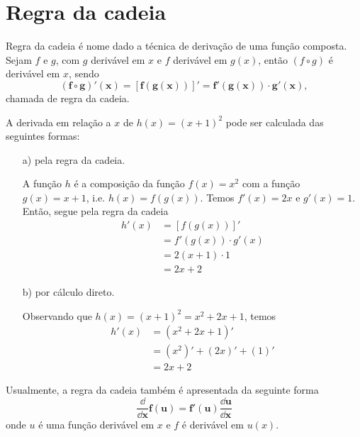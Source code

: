 \cleardoublepage\documentclass[../main.tex]{subfiles}
\begin{document}
\section{Regra da cadeia}\label{Chap:RegraCadeia}
Regra da cadeia é nome dado a técnica de derivação de uma função composta. Sejam $f$ e $g$, com $g$ derivável em $x$ e $f$ derivável em $g(x)$, então $(f\circ g)$ é derivável em $x$, sendo
\begin{equation}
  \boldsymbol{(f\circ g)'(x) = [f(g(x))]' = f'(g(x))\cdot g'(x)},
\end{equation}
chamada de regra da cadeia.

\begin{ex}
  A derivada em relação a $x$ de $h(x) = (x+1)^2$ pode ser calculada das seguintes formas:
  \begin{enumerate}
  \item[a)] pela regra da cadeia.
  
\begin{solution}
    A função $h$ é a composição da função $f(x)=x^2$ com a função $g(x)=x+1$, i.e. $h(x) = f(g(x))$. Temos $f'(x)=2x$ e $g'(x)=1$. Então, segue pela regra da cadeia
    \begin{align*}
      h'(x) &= [f(g(x))]' \\
            &= f'(g(x))\cdot g'(x) \\
            &= 2(x+1)\cdot 1 \\
            &= 2x+2
    \end{align*}
\end{solution}
  \item[b)] por cálculo direto.
  
\begin{solution}
    Observando que $h(x)=(x+1)^2=x^2+2x+1$, temos
    \begin{align*}
      h'(x) &= (x^2+2x+1)' \\
            &= (x^2)' + (2x)' + (1)' \\
            &= 2x + 2
    \end{align*}
      \end{solution}
  \end{enumerate}
\end{ex}

Usualmente, a regra da cadeia também é apresentada da seguinte forma
\begin{equation*}\label{eq:deriv_regra_da_cadeia}
  \boldsymbol{\frac{\dd}{\dd x}f(u) = f'(u)\frac{\dd u}{\dd x}}
\end{equation*}
onde $u$ é uma função derivável em $x$ e $f$ é derivável em $u(x)$.
\end{document}
